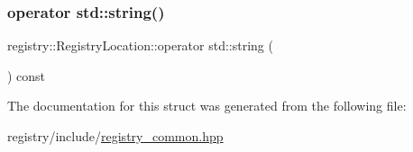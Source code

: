 \subsubsection{\texorpdfstring{operator std\+::string()}{operator std::string()}}
{\footnotesize\ttfamily registry\+::\+Registry\+Location\+::operator std\+::string (\begin{DoxyParamCaption}{ }\end{DoxyParamCaption}) const\hspace{0.3cm}{\ttfamily [inline]}}



The documentation for this struct was generated from the following file\+:\begin{DoxyCompactItemize}
\item 
registry/include/\hyperlink{registry__common_8hpp}{registry\+\_\+common.\+hpp}\end{DoxyCompactItemize}
